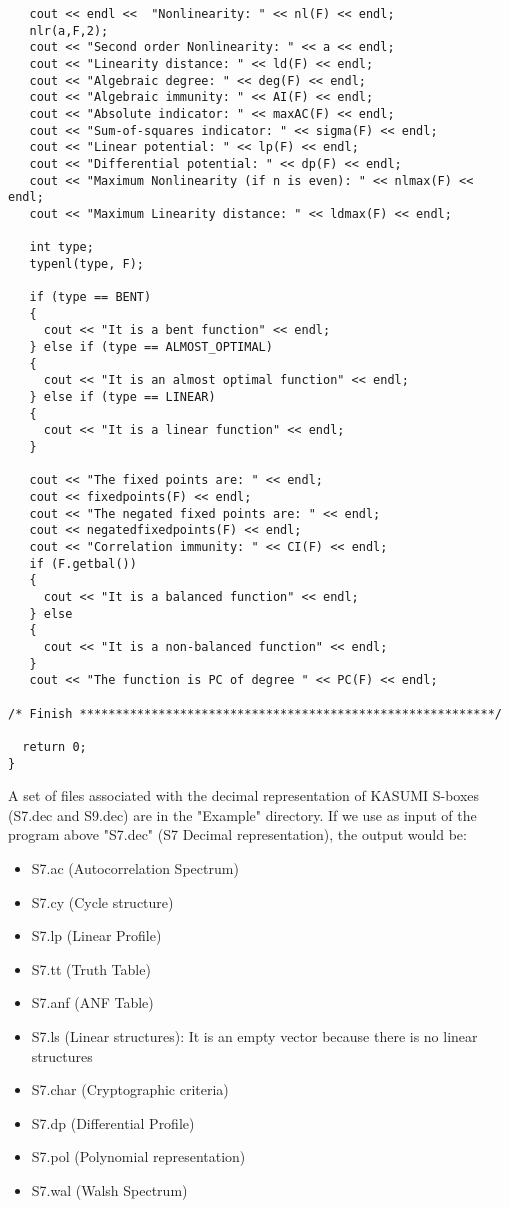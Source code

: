 \begin{verbatim}
   cout << endl <<  "Nonlinearity: " << nl(F) << endl;
   nlr(a,F,2);
   cout << "Second order Nonlinearity: " << a << endl;
   cout << "Linearity distance: " << ld(F) << endl;
   cout << "Algebraic degree: " << deg(F) << endl;
   cout << "Algebraic immunity: " << AI(F) << endl;
   cout << "Absolute indicator: " << maxAC(F) << endl;
   cout << "Sum-of-squares indicator: " << sigma(F) << endl;
   cout << "Linear potential: " << lp(F) << endl;
   cout << "Differential potential: " << dp(F) << endl;
   cout << "Maximum Nonlinearity (if n is even): " << nlmax(F) << endl;
   cout << "Maximum Linearity distance: " << ldmax(F) << endl;

   int type;
   typenl(type, F);

   if (type == BENT)
   {
     cout << "It is a bent function" << endl;
   } else if (type == ALMOST_OPTIMAL)
   {
     cout << "It is an almost optimal function" << endl;
   } else if (type == LINEAR)
   {
     cout << "It is a linear function" << endl;
   }

   cout << "The fixed points are: " << endl;
   cout << fixedpoints(F) << endl;
   cout << "The negated fixed points are: " << endl;
   cout << negatedfixedpoints(F) << endl;
   cout << "Correlation immunity: " << CI(F) << endl;
   if (F.getbal())
   {
     cout << "It is a balanced function" << endl;
   } else
   {
     cout << "It is a non-balanced function" << endl;
   }
   cout << "The function is PC of degree " << PC(F) << endl;

/* Finish **********************************************************/

  return 0;
}

\end{verbatim}

A set of files associated with the decimal representation of KASUMI S-boxes (S7.dec and S9.dec) are in the "Example" directory. If we use as input of the program above "S7.dec" (S7 Decimal representation), the output would be: 

\begin{itemize}
\item S7.ac (Autocorrelation Spectrum)
\item S7.cy (Cycle structure)
\item S7.lp (Linear Profile)
\item S7.tt (Truth Table)
\item S7.anf (ANF Table)
\item S7.ls (Linear structures): It is an empty vector because there is no linear structures 
\item S7.char	(Cryptographic criteria)
\item S7.dp (Differential Profile)
\item S7.pol (Polynomial representation)
\item S7.wal (Walsh Spectrum)
\end{itemize}

